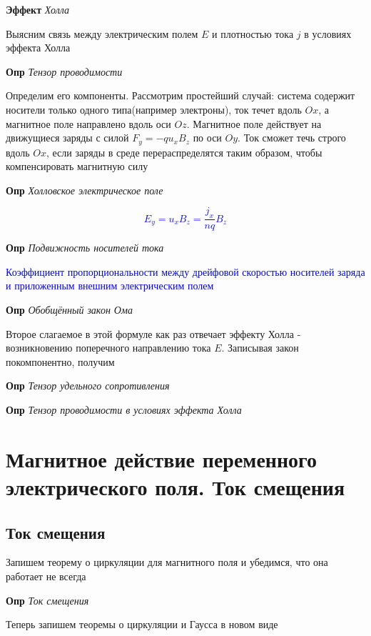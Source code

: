 \documentclass[a4paper, 14pt]{article}
\begin{document}
    \textbf{Эффект} \textit{Холла}
    
    Выясним связь между электрическим полем $E$ и плотностью тока $j$ в условиях эффекта Холла
    
    \textbf{Опр} \textit{Тензор проводимости}
    
    Определим его компоненты.
    Рассмотрим простейший случай: система содержит носители только одного типа(например электроны), ток течет вдоль
    $Ox$, а магнитное поле направлено вдоль оси $Oz$.
    Магнитное поле действует на движущиеся заряды с силой $F_y = -q u_x B_z$ по оси $Oy$.
    Ток сможет течь строго вдоль $Ox$, если заряды в среде перераспределятся таким образом, чтобы компенсировать
    магнитную силу
    
    \textbf{Опр} \textit{Холловское электрическое поле}
    
    \textcolor{blue}{\[ E_y = u_x B_z = \frac{j_x}{nq} B_z \]}
    
    \textbf{Опр} \textit{Подвижность носителей тока}
    
    \textcolor{blue}{Коэффициент пропорциональности между дрейфовой скоростью носителей заряда и приложенным внешним
    электрическим полем}
    
    \textbf{Опр} \textit{Обобщённый закон Ома}
    
    Второе слагаемое в этой формуле как раз отвечает эффекту Холла - возникновению поперечного направлению тока $E$.
    Записывая закон покомпонентно, получим
    
    \textbf{Опр} \textit{Тензор удельного сопротивления}
    
    \textbf{Опр} \textit{Тензор проводимости в условиях эффекта Холла}
    
    \section{Магнитное действие переменного электрического поля.
    Ток смещения}
    
    \subsection{Ток смещения}
    
    Запишем теорему о циркуляции для магнитного поля и убедимся, что она работает не всегда
    
    \textbf{Опр} \textit{Ток смещения}
    
    Теперь запишем теоремы о циркуляции и Гаусса в новом виде
    
\end{document}
